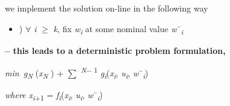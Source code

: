 \documentclass[12pt,twoside]{article}
\begin{document}
\begin{itemize}
\begin{itemize}
{\fontsize{10pt}{12.0pt}\selectfont we implement the solution on-line in the following way\par}\par


\vspace{\baselineskip}
\begin{itemize}
	\item {\fontsize{10pt}{12.0pt}) $ \forall $ \textit{i }$ \geq $  \textit{k}, fix \textit{w\textsubscript{i} }at some nominal value \textit{w}¯\textit{\textsubscript{i}}\par}
\end{itemize}\par

\begin{adjustwidth}{0.6in}{0.0in}
{\fontsize{10pt}{12.0pt}\selectfont \textbf{– this leads to a deterministic problem formulation,}\par}\par

\end{adjustwidth}

\begin{adjustwidth}{0.85in}{0.7in}
\begin{Center}
{\fontsize{10pt}{12.0pt}\selectfont \textit{min\   g\textsubscript{N} }(\textit{x\textsubscript{N} }) + $ \sum $ \textit{\textsuperscript{N}}\textsuperscript{$-$ 1} \textit{g\textsubscript{i}}(\textit{x\textsubscript{i}}, \textit{u\textsubscript{i}}, \textit{w}¯\textit{\textsubscript{i}})\par}
\end{Center}\par

\end{adjustwidth}

\begin{adjustwidth}{0.85in}{0.7in}
\begin{Center}
{\fontsize{10pt}{12.0pt}\selectfont \textit{where x\textsubscript{i}}\textsubscript{+1} = \textit{f\textsubscript{i}}(\textit{x\textsubscript{i}}, \textit{u\textsubscript{i}}, \textit{w}¯\textit{\textsubscript{i}})\par}
\end{Center}\par

\end{adjustwidth}

\end{itemize}
\end{itemize}
\end{document}
